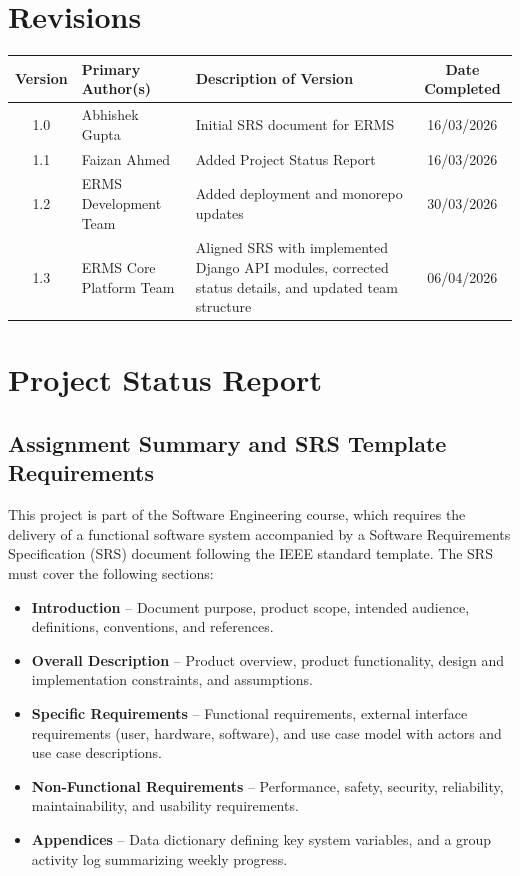 \documentclass[12pt]{article}
\begin{document}
\section*{Revisions}

\begin{center}
\begin{tabular}{|c|p{3.5cm}|p{7.2cm}|c|}
\hline
Version & Primary Author(s) & Description of Version & Date Completed \\
\hline
1.0 & Abhishek Gupta & Initial SRS document for ERMS & 16/03/2026 \\
\hline
1.1 & Faizan Ahmed & Added Project Status Report & 16/03/2026 \\
\hline
1.2 & ERMS Development Team & Added deployment and monorepo updates & 30/03/2026 \\
\hline
1.3 & ERMS Core Platform Team & Aligned SRS with implemented Django API modules, corrected status details, and updated team structure & 06/04/2026 \\
\hline
\end{tabular}
\end{center}

\newpage


\section{Project Status Report}

\subsection{Assignment Summary and SRS Template Requirements}

This project is part of the Software Engineering course, which requires the delivery of a functional software system accompanied by a Software Requirements Specification (SRS) document following the IEEE standard template. The SRS must cover the following sections:

\begin{itemize}
    \item \textbf{Introduction} -- Document purpose, product scope, intended audience, definitions, conventions, and references.
    \item \textbf{Overall Description} -- Product overview, product functionality, design and implementation constraints, and assumptions.
    \item \textbf{Specific Requirements} -- Functional requirements, external interface requirements (user, hardware, software), and use case model with actors and use case descriptions.
    \item \textbf{Non-Functional Requirements} -- Performance, safety, security, reliability, maintainability, and usability requirements.
    \item \textbf{Appendices} -- Data dictionary defining key system variables, and a group activity log summarizing weekly progress.
\end{itemize}
\end{document}
